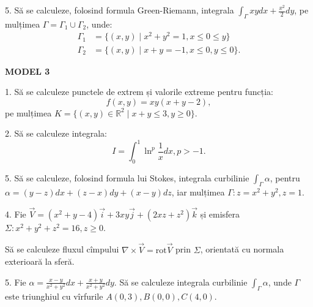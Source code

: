 \documentclass[11pt,a4paper]{article}
\newcommand\ds{\displaystyle}
\newcommand\RR{\mathbb{R}}
\theoremstyle{dotless}
\theoremstyle{dotlessdr}
\begin{document}
\vspace{1cm}

5. Să se calculeze, folosind formula Green-Riemann, integrala
$\ds\int_\Gamma xydx + \frac{x^2}{2} dy$, pe mulțimea $\Gamma = \Gamma_1 \cup \Gamma_2$,
unde:
\begin{align*}
  \Gamma_1 &= \{(x, y) \mid x^2 + y^2 = 1, x \leq 0 \leq y \} \\
  \Gamma_2 &= \{(x, y) \mid x + y = -1, x \leq 0, y \leq 0 \}.
\end{align*}

\vspace{2cm}

\textbf{MODEL 3}

1. Să se calculeze punctele de extrem și valorile extreme pentru funcția:
\[
  f(x, y) = xy(x + y - 2),
\]
pe mulțimea $K = \{(x, y) \in \RR^2 \mid x + y \leq 3, y \geq 0\}$.

\vspace{1cm}

2. Să se calculeze integrala:
\[
  I = \int_0^1 \ln^p \frac{1}{x} dx, p > -1.
\]

\vspace{1cm}

5. Să se calculeze, folosind formula lui Stokes, integrala curbilinie
$\int_\Gamma \alpha$, pentru $\alpha = (y - z) dx + (z - x)dy + (x - y) dz$,
iar mulțimea $\Gamma: z = x^2 + y^2, z = 1$.

\vspace{1cm}

4. Fie $\vec{V} = (x^2 + y - 4) \vec{i} + 3xy\vec{j} + (2xz + z^2) \vec{k}$ și
emisfera $\Sigma: x^2 + y^2 + z^2 = 16, z \geq 0$.

Să se calculeze fluxul cîmpului $\nabla \times \vec{V} = \mathrm{rot} \vec{V}$ prin
$\Sigma$, orientată cu normala exterioară la sferă.

\vspace{1cm}

5. Fie $\alpha = \frac{x - y}{x^2 + y^2} dx + \frac{x + y}{x^2 + y^2} dy$.
Să se calculeze integrala curbilinie $\int_\Gamma \alpha$, unde $\Gamma$ este triunghiul
cu vîrfurile $A(0, 3), B(0, 0), C(4, 0)$.
\end{document}
